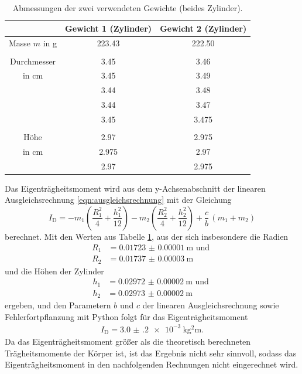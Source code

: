 \begin{table}
  \centering
  \begin{tabular}{c| c c}
    \toprule
        & Gewicht 1 (Zylinder) & Gewicht 2 (Zylinder)\\
    \midrule
    Masse $m$ in \si{\gram} & 223.43 & 222.50\\
    & & \\
    Durchmesser          & 3.45 & 3.46  \\
    in \si{\centi\meter} & 3.45 & 3.49  \\
                         & 3.44 & 3.48  \\
                         & 3.44 & 3.47  \\
                         & 3.45 & 3.475 \\
    & & \\
    Höhe                 & 2.97 & 2.975 \\
    in \si{\centi\meter} & 2.975 & 2.97 \\
                         & 2.97 & 2.975 \\
    \bottomrule
  \end{tabular}
  \caption{Abmessungen der zwei verwendeten Gewichte (beides Zylinder).}
  \label{tab:gewichte}
\end{table}
\noindent Das Eigenträgheitsmoment wird aus dem y-Achsenabschnitt der linearen
Ausgleichsrechnung \eqref{eqn:ausgleichsrechnung} mit der Gleichung
\begin{equation}
  I_\text{D} = - m_1\left(\frac{R_1^2}{4} + \frac{h_1^2}{12}\right) - m_2 \left(
  \frac{R_2^2}{4}+\frac{h_2^2}{12}\right) + \frac{c}{b}\, (m_1 + m_2)
  \label{eqn:eigentraegheitsmoment}
\end{equation}
berechnet. Mit den Werten aus Tabelle \ref{tab:gewichte}, aus der sich insbesondere
die Radien
\begin{align*}
  R_1 &= \SI{0.01723(1)}{\meter} \text{ und }\\
  R_2 &= \SI{0.01737(3)}{\meter}
\end{align*}
und die Höhen der Zylinder
\begin{align*}
  h_1 &= \SI{0.02972(2)}{\meter} \text{ und } \\
  h_2 &= \SI{0.02973(2)}{\meter}
\end{align*}
ergeben, und den Parametern $b$ und $c$ der linearen Ausgleichsrechnung sowie
Fehlerfortpflanzung mit Python folgt für das Eigenträgheitsmoment
\begin{align*}
  I_\text{D} = \SI{3.0(2)e-3}{\kilo\gram\squared\meter}.
\end{align*}
Da das Eigenträgheitsmoment größer als die theoretisch berechneten Trägheitsmomente
der Körper ist, ist das Ergebnis nicht sehr sinnvoll, sodass das Eigenträgheitsmoment
in den nachfolgenden Rechnungen nicht eingerechnet wird.

